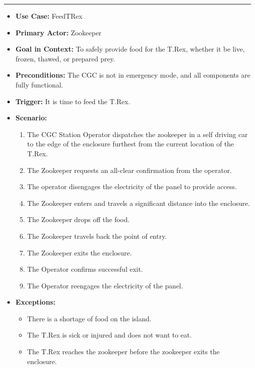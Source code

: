 \documentclass[12pt]{article}
\begin{document}
    \par\noindent\rule{\textwidth}{0.4pt}    
    \begin{itemize}
        \item[]\textbf{Use Case:} 
            FeedTRex                                

        \item[]\textbf{Primary Actor:}
            Zookeeper

        \item[]\textbf{Goal in Context:}
            To safely provide food for the T.Rex, whether it be live, frozen, thawed, or prepared
            prey.

        \item[]\textbf{Preconditions:}
            The CGC is not in emergency mode, and all components are fully functional.

        \item[]\textbf{Trigger:}
            It is time to feed the T.Rex.

        \item[]\textbf{Scenario:}
            \begin{enumerate}
                \item The CGC Station Operator dispatches the zookeeper in a self driving car
                to the edge of the enclosure furthest from the current location of the T.Rex.
                \item The Zookeeper requests an all-clear confirmation from the operator.
                \item The operator disengages the electricity of the panel to provide access.
                \item The Zookeeper enters and travels a significant distance into the enclosure.
                \item The Zookeeper drops off the food.
                \item The Zookeeper travels back the point of entry.
                \item The Zookeeper exits the enclosure.
                \item The Operator confirms successful exit.
                \item The Operator reengages the electricity of the panel. 
            \end{enumerate}

        \item[]\textbf{Exceptions:}
            \begin{itemize}
                \item[] There is a shortage of food on the island.
                \item[] The T.Rex is sick or injured and does not want to eat.
                \item[] The T.Rex reaches the zookeeper before the zookeeper exits the enclosure.
            \end{itemize}


\end{itemize}
\end{document}
